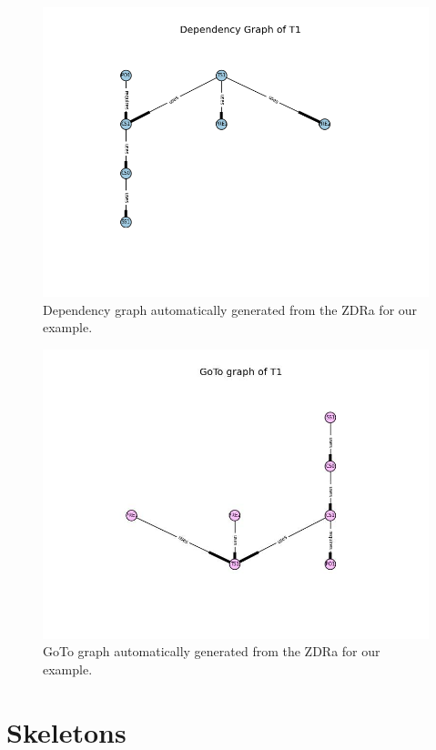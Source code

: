 \begin{figure}[H]
\centering
\includegraphics[scale=0.5]{Figures/fullexample/dp_fullexample.png}
\caption{Dependency graph automatically generated from the ZDRa for our example. \label{fig:depexample}}
\end{figure}

\begin{figure}[H]
\centering
\includegraphics[scale=0.5]{Figures/fullexample/goto_fullexample.jpg}
\caption{GoTo graph automatically generated from the ZDRa for our example. \label{fig:gotoexample}}
\end{figure}

\section{Skeletons}

